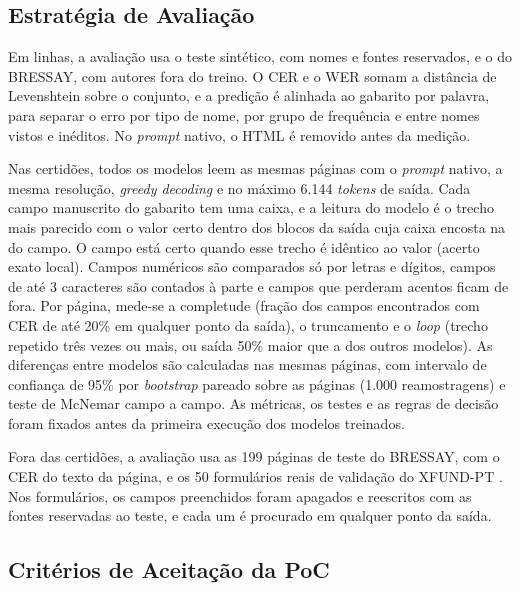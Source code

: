 \subsection{Estratégia de Avaliação}
\label{subsec:aval}

Em linhas, a avaliação usa o teste sintético, com nomes e fontes reservados, e o do BRESSAY, com autores fora do treino. O CER e o WER somam a distância de Levenshtein sobre o conjunto, e a predição é alinhada ao gabarito por palavra, para separar o erro por tipo de nome, por grupo de frequência e entre nomes vistos e inéditos. No \emph{prompt} nativo, o HTML é removido antes da medição.

Nas certidões, todos os modelos leem as mesmas páginas com o \emph{prompt} nativo, a mesma resolução, \emph{greedy decoding} e no máximo 6.144 \emph{tokens} de saída. Cada campo manuscrito do gabarito tem uma caixa, e a leitura do modelo é o trecho mais parecido com o valor certo dentro dos blocos da saída cuja caixa encosta na do campo. O campo está certo quando esse trecho é idêntico ao valor (acerto exato local). Campos numéricos são comparados só por letras e dígitos, campos de até 3 caracteres são contados à parte e campos que perderam acentos ficam de fora. Por página, mede-se a completude (fração dos campos encontrados com CER de até 20\% em qualquer ponto da saída), o truncamento e o \emph{loop} (trecho repetido três vezes ou mais, ou saída 50\% maior que a dos outros modelos). As diferenças entre modelos são calculadas nas mesmas páginas, com intervalo de confiança de 95\% por \emph{bootstrap} pareado sobre as páginas (1.000 reamostragens) e teste de McNemar campo a campo. As métricas, os testes e as regras de decisão foram fixados antes da primeira execução dos modelos treinados.

Fora das certidões, a avaliação usa as 199 páginas de teste do BRESSAY, com o CER do texto da página, e os 50 formulários reais de validação do XFUND-PT \cite{xfund2022}. Nos formulários, os campos preenchidos foram apagados e reescritos com as fontes reservadas ao teste, e cada um é procurado em qualquer ponto da saída.

\subsection{Critérios de Aceitação da PoC}

